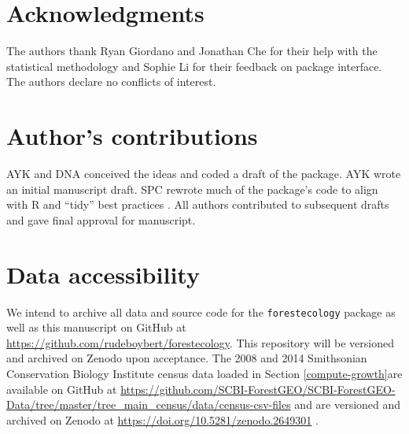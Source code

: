 \documentclass[12pt]{article}
\begin{document}
\hypertarget{acknowledgments}{%
\section{Acknowledgments}\label{acknowledgments}}

The authors thank Ryan Giordano and Jonathan Che for their help with the
statistical methodology and Sophie Li for their feedback on package
interface. The authors declare no conflicts of interest.

\hypertarget{authors-contributions}{%
\section{Author's contributions}\label{authors-contributions}}

AYK and DNA conceived the ideas and coded a draft of the package. AYK
wrote an initial manuscript draft. SPC rewrote much of the package's
code to align with R and ``tidy'' best practices
\citep{wickham_welcome_2019}. All authors contributed to subsequent
drafts and gave final approval for manuscript.

\hypertarget{data-accessibility}{%
\section{Data accessibility}\label{data-accessibility}}

We intend to archive all data and source code for the
\texttt{forestecology} package as well as this manuscript on GitHub at
\url{https://github.com/rudeboybert/forestecology}. This repository will
be versioned and archived on Zenodo upon acceptance. The 2008 and 2014
Smithsonian Conservation Biology Institute census data loaded in Section
\ref{compute-growth}are available on GitHub at
\url{https://github.com/SCBI-ForestGEO/SCBI-ForestGEO-Data/tree/master/tree_main_census/data/census-csv-files}
and are versioned and archived on Zenodo at
\url{https://doi.org/10.5281/zenodo.2649301}
\citep{gonzalez-akre_scbi-forestgeoscbi-forestgeo-data_2020}.



\end{document}
